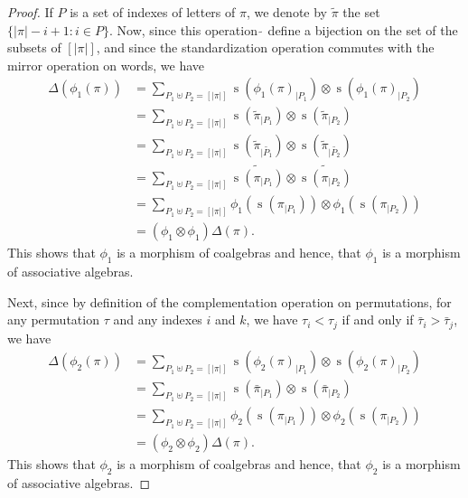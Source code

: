 \documentclass[a4paper,10pt]{llncs}
\DeclareMathOperator{\STD}{\mathrm{s}}
\begin{document}
\begin{proof}
    If $P$ is a set of indexes of letters of $\pi$, we denote by
    $\widetilde{\pi}$ the set $\{|\pi| - i  + 1 : i \in P\}$. Now, since
    this operation $\widetilde{\,}$ define a bijection on the set of the
    subsets of $[|\pi|]$, and since the standardization operation
    commutes with the mirror operation on words, we have
    \begin{equation} \begin{split}
        \Delta(\phi_1(\pi))
        & = \sum_{P_1 \uplus P_2 = [|\pi|]}
        \STD\left(\phi_1(\pi)_{|P_1}\right)
        \otimes \STD\left(\phi_1(\pi)_{|P_2}\right) \\
        & = \sum_{P_1 \uplus P_2 = [|\pi|]}
        \STD\left(\widetilde{\pi}_{|P_1}\right)
        \otimes \STD\left(\widetilde{\pi}_{|P_2}\right) \\
        & = \sum_{P_1 \uplus P_2 = [|\pi|]}
        \STD\left(\widetilde{\pi}_{|\widetilde{P_1}}\right)
        \otimes \STD\left(\widetilde{\pi}_{|\widetilde{P_2}}\right) \\
        & = \sum_{P_1 \uplus P_2 = [|\pi|]}
        \widetilde{\STD\left(\pi_{|P_1}\right)}
        \otimes \widetilde{\STD\left(\pi_{|P_2}\right)} \\
        & = \sum_{P_1 \uplus P_2 = [|\pi|]}
        \phi_1\left(\STD\left(\pi_{|P_1}\right)\right)
        \otimes \phi_1\left(\STD\left(\pi_{|P_2}\right)\right) \\
        & = (\phi_1 \otimes \phi_1) \Delta(\pi).
    \end{split} \end{equation}
    This shows that $\phi_1$ is a morphism of coalgebras and hence, that
    $\phi_1$ is a morphism of associative algebras.
    \smallskip

    Next, since by definition of the complementation operation on
    permutations, for any permutation $\tau$ and any indexes $i$ and $k$,
    we have $\tau_i < \tau_j$ if and only if $\bar \tau_i > \bar \tau_j$,
    we have
    \begin{equation} \begin{split}
        \Delta(\phi_2(\pi))
        & = \sum_{P_1 \uplus P_2 = [|\pi|]}
        \STD\left(\phi_2(\pi)_{|P_1}\right)
        \otimes \STD\left(\phi_2(\pi)_{|P_2}\right) \\
        & = \sum_{P_1 \uplus P_2 = [|\pi|]}
        \STD\left(\bar \pi_{|P_1}\right)
        \otimes \STD\left(\bar \pi_{|P_2}\right) \\
        & = \sum_{P_1 \uplus P_2 = [|\pi|]}
        \phi_2\left(\STD\left(\pi_{|P_1}\right)\right)
        \otimes \phi_2\left(\STD\left(\pi_{|P_2}\right)\right) \\
        & = (\phi_2 \otimes \phi_2) \Delta(\pi).
    \end{split} \end{equation}
    This shows that $\phi_2$ is a morphism of coalgebras and hence, that
    $\phi_2$ is a morphism of associative algebras.
    \smallskip


\end{proof}
\end{document}

